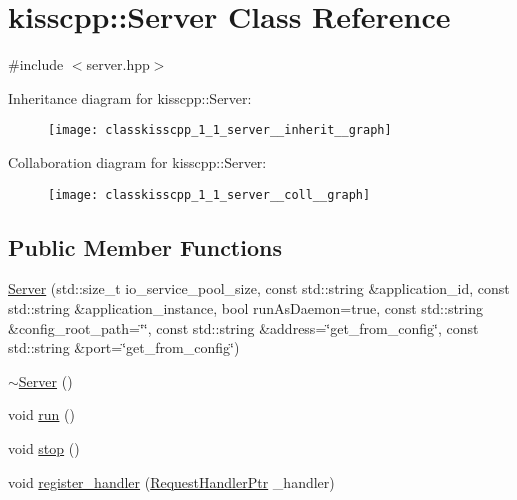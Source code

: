 \hypertarget{classkisscpp_1_1_server}{\section{kisscpp\-:\-:Server Class Reference}
\label{classkisscpp_1_1_server}
}


{\ttfamily \#include $<$server.\-hpp$>$}



Inheritance diagram for kisscpp\-:\-:Server\-:
\nopagebreak
\begin{figure}[H]
\begin{center}
\leavevmode
\texttt{[image: classkisscpp\_1\_1\_server\_\_inherit\_\_graph]}
\end{center}
\end{figure}


Collaboration diagram for kisscpp\-:\-:Server\-:
\nopagebreak
\begin{figure}[H]
\begin{center}
\leavevmode
\texttt{[image: classkisscpp\_1\_1\_server\_\_coll\_\_graph]}
\end{center}
\end{figure}
\subsection*{Public Member Functions}
\begin{DoxyCompactItemize}
\item 
\hyperlink{classkisscpp_1_1_server_a87029a4be5b4825225eb88e36fb3ddfb}{Server} (std\-::size\-\_\-t io\-\_\-service\-\_\-pool\-\_\-size, const std\-::string \&application\-\_\-id, const std\-::string \&application\-\_\-instance, bool run\-As\-Daemon=true, const std\-::string \&config\-\_\-root\-\_\-path=\char`\"{}\char`\"{}, const std\-::string \&address=\char`\"{}get\-\_\-from\-\_\-config\char`\"{}, const std\-::string \&port=\char`\"{}get\-\_\-from\-\_\-config\char`\"{})
\item 
\hyperlink{classkisscpp_1_1_server_acb8a45f705aaecf829a63f8f9254acb6}{$\sim$\-Server} ()
\item 
void \hyperlink{classkisscpp_1_1_server_aa41d65074f051e5f5481671cd18d0435}{run} ()
\item 
void \hyperlink{classkisscpp_1_1_server_aba167cdf551f3b29937c923ad7d18964}{stop} ()
\item 
void \hyperlink{classkisscpp_1_1_server_a2f2e5671ce5e38610966fb6011d9fef9}{register\-\_\-handler} (\hyperlink{namespacekisscpp_a21e40edcd4f1a3c7c1cc0015b576c8e5}{Request\-Handler\-Ptr} \-\_\-handler)
\end{DoxyCompactItemize}


